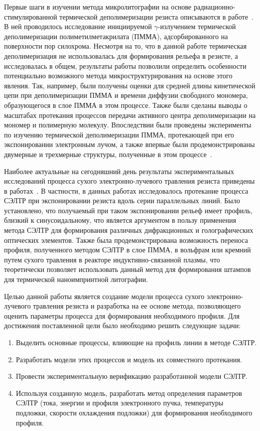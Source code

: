 \previouswork

Первые шаги в изучении метода микролитографии на основе радиационно-стимулированной термической деполимеризации резиста описываются в работе~\cite{Bruk_2000}.
В ней проводилось исследование инициируемой $\gamma$-излучением термической деполимеризации полиметилметакрилата (ПММА), адсорбированного на поверхности пор силохрома.
Несмотря на то, что в данной работе термическая деполимеризация не использовалась для формирования рельефа в резисте, а исследовалась в общем, результаты работы позволили определить особенности потенциально возможного метода микроструктурирования на основе этого явления.
Так, например, были получены оценки для средней длины кинетической цепи при деполимеризации ПММА и времени диффузии свободного мономера, образующегося в слое ПММА в этом процессе.
Также были сделаны выводы о масштабах протекания процессов передачи активного центра деполимеризации на мономер и полимерную молекулу.
Впоследствии были проведены эксперименты по изучению термической деполимеризации ПММА, протекающей при его экспонировании электронным лучом, а также впервые были продемонстрированы двумерные и трехмерные структуры, полученные в этом процессе~\cite{Bruk_2013}.

Наиболее актуальные на сегодняшний день результаты экспериментальных исследований процесса сухого электронно-лучевого травления резиста приведены в работах~\cite{Bruk_2015_co, Bruk_2016_mee}.
В частности, в данных работах исследовалось протекание процесса СЭЛТР при экспонировании резиста вдоль серии параллельных линий.
Было установлено, что получаемый при таком экспонировании рельеф имеет профиль, близкий к синусоидальному, что является аргументом в пользу применения метода СЭЛТР для формирования различных дифракционных и голографических оптических элементов.
Также была продемонстрирована возможность переноса профиля, полученного методом СЭЛТР в слое ПММА, в вольфрам или кремний путем сухого травления в реакторе индуктивно-связанной плазмы, что теоретически позволяет использовать данный метод для формирования штампов для термической наноимпринтной литографии.


\aimsandtasks
Целью данной работы является создание модели процесса сухого электронно-лучевого травления резиста и разработка на ее основе метода, позволяющего оценить параметры процесса для формирования необходимого профиля. Для достижения поставленной цели было необходимо решить следующие задачи:

\begin{enumerate}
	\item Выделить основные процессы, влияющие на профиль линии в методе СЭЛТР.
	\item Разработать модели этих процессов и модель их совместного протекания.
	\item Провести экспериментальную верификацию разработанной модели СЭЛТР.
	\item Используя созданную модель, разработать метод определения параметров СЭЛТР (тока, энергии и профиля электронного пучка, температуры подложки, скорости охлаждения подложки) для формирования необходимого профиля.	
\end{enumerate}



